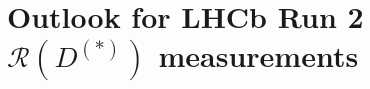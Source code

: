 \documentclass[12pt,letterpaper]{article}
\newcommand{\PRLrule}{
    \bigskip
    \noindent\makebox[\linewidth]{
        \resizebox{0.3333\linewidth}{1pt}{$\blacklozenge$}
    }
    \bigskip
}
\def\RDDst/{\ensuremath{\mathcal{R}(D^{(*)})}}
\begin{document}




\section{Outlook for LHCb Run 2 \RDDst/ measurements}


\PRLrule
\printbibliography
\end{document}
